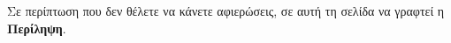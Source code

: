 Σε περίπτωση που δεν θέλετε να κάνετε αφιερώσεις, σε αυτή τη σελίδα να γραφτεί
η \textbf{Περίληψη}.
\blankpage
